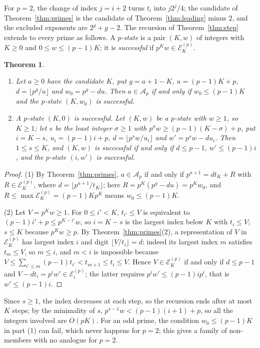 \documentclass[11pt]{amsart}
\newtheorem{Theorem}{Theorem}[section]
\theoremstyle{definition}
\begin{document}
For $p=2$, the change of index $j=i+2$ turns $t_i$ into $j2^j/4$; the candidate of Theorem~\ref{thm:primes} is the candidate of Theorem~\ref{thm:leading} minus $2$, and the excluded exponents are $2^g+g-2$. The recursion of Theorem~\ref{thm:step} extends to every prime as follows. A \emph{$p$-state} is a pair $(K,w)$ of integers with $K\ge0$ and $0\le w\le(p-1)K$; it is \emph{successful} if $p^Kw\in\mathcal{E}^{(p)}_K$.

\begin{Theorem}
\label{thm:primestep}
\begin{enumerate}
\item Let $a\ge0$ have the candidate $K$, put $g=a+1-K$, $u=(p-1)K+p$, $d=\lfloor p^g/u\rfloor$ and $w_0=p^g-du$. Then $a\in\mathcal{A}_p$ if and only if $w_0\le(p-1)K$ and the $p$-state $(K,w_0)$ is successful.
\item A $p$-state $(K,0)$ is successful. Let $(K,w)$ be a $p$-state with $w\ge1$, so $K\ge1$; let $s$ be the least integer $\sigma\ge1$ with $p^\sigma w\ge(p-1)(K-\sigma)+p$, put $i=K-s$, $u_i=(p-1)i+p$, $d=\lfloor p^sw/u_i\rfloor$ and $w'=p^sw-du_i$. Then $1\le s\le K$, and $(K,w)$ is successful if and only if $d\le p-1$, $w'\le(p-1)i$, and the $p$-state $(i,w')$ is successful.
\end{enumerate}
\end{Theorem}
\begin{proof}
(1) By Theorem~\ref{thm:primes}, $a\in\mathcal{A}_p$ if and only if $p^{a+1}=dt_K+R$ with $R\in\mathcal{E}^{(p)}_K$, where $d=\lfloor p^{a+1}/t_K\rfloor$; here $R=p^K(p^g-du)=p^Kw_0$, and $R\le\max\mathcal{E}^{(p)}_K=(p-1)Kp^K$ means $w_0\le(p-1)K$.

(2) Let $V=p^Kw\ge1$. For $0\le i'<K$, $t_{i'}\le V$ is equivalent to $(p-1)i'+p\le p^{K-i'}w$, so $i=K-s$ is the largest index below $K$ with $t_i\le V$; $s\le K$ because $p^Kw\ge p$. By Theorem~\ref{thm:primes}(2), a representation of $V$ in $\mathcal{E}^{(p)}_K$ has largest index $i$ and digit $\lfloor V/t_i\rfloor=d$: indeed its largest index $m$ satisfies $t_m\le V$, so $m\le i$, and $m<i$ is impossible because $V\le\sum_{i'\le m}(p-1)t_{i'}<t_{m+1}\le t_i\le V$. Hence $V\in\mathcal{E}^{(p)}_K$ if and only if $d\le p-1$ and $V-dt_i=p^iw'\in\mathcal{E}^{(p)}_i$; the latter requires $p^iw'\le(p-1)ip^i$, that is $w'\le(p-1)i$.
\end{proof}

Since $s\ge1$, the index decreases at each step, so the recursion ends after at most $K$ steps; by the minimality of $s$, $p^{s-1}w<(p-1)(i+1)+p$, so all the integers involved are $O(pK)$. For an odd prime, the condition $w_0\le(p-1)K$ in part (1) can fail, which never happens for $p=2$; this gives a family of non-members with no analogue for $p=2$.
\end{document}

